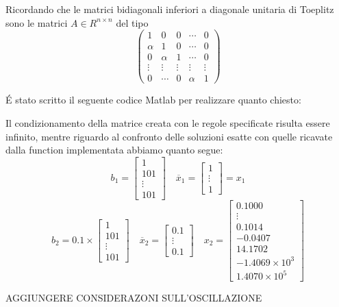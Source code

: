 \begin{center}
\footnotesize\noindent{}\end{center}

\noindent Ricordando che le matrici bidiagonali inferiori a diagonale unitaria di Toeplitz sono le matrici \(A \in R^{n \times n}\) del tipo \[\begin{pmatrix} 1 & 0 & 0 & \cdots & 0 \\ \alpha & 1 & 0 & \cdots & 0 \\ 0 & \alpha & 1 & \cdots & 0 \\ \vdots & \vdots & \vdots & \vdots & \vdots \\ 0 & \cdots & 0 & \alpha & 1\end{pmatrix}\]

\noindent \'E stato scritto il seguente codice Matlab per realizzare quanto chiesto:


\noindent Il condizionamento della matrice creata con le regole specificate risulta essere infinito, mentre riguardo al confronto delle soluzioni esatte con quelle ricavate dalla function implementata abbiamo quanto segue:
\[
b_1 = \begin{bmatrix}1\\101\\\vdots \\101 \end{bmatrix} \quad \overline{x}_1=\begin{bmatrix}1\\\vdots \\1 \end{bmatrix} = x_1
\]
\[
b_2 = 0.1 \times \begin{bmatrix}1\\101\\\vdots \\101 \end{bmatrix} \quad \overline{x}_2=\begin{bmatrix}0.1\\\vdots \\0.1 \end{bmatrix} \quad x_2=\begin{bmatrix}0.1000\\ \vdots \\ 0.1014 \\ -0.0407 \\ 14.1702 \\ -1.4069 \times 10^3 \\ 1.4070 \times 10^5 \end{bmatrix}
\]

AGGIUNGERE CONSIDERAZONI SULL'OSCILLAZIONE
